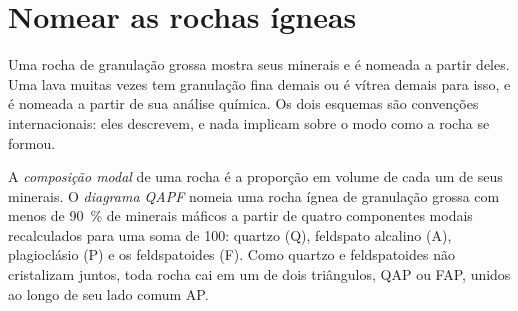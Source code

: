 \section{Nomear as rochas ígneas}\label{sec:b2:magmatic-series:naming}

Uma rocha de granulação grossa mostra seus minerais e é nomeada a partir deles. Uma lava muitas vezes tem granulação
fina demais ou é vítrea demais para isso, e é nomeada a partir de sua análise química. Os dois
esquemas são convenções internacionais: eles descrevem, e nada implicam sobre o modo como
a rocha se formou.

\begin{definition}\label{def:b2:magmatic-series:qapf}
A \emph{composição modal} de uma rocha é a proporção em
volume de cada um de seus minerais. O \emph{diagrama QAPF} nomeia uma
rocha ígnea de granulação grossa com menos de \qty{90}{\percent} de minerais máficos a partir de
quatro componentes modais recalculados para uma soma de 100: quartzo (Q), feldspato alcalino
(A), plagioclásio (P) e os feldspatoides (F). Como quartzo e feldspatoides não
cristalizam juntos, toda rocha cai em um de dois triângulos, QAP ou FAP, unidos
ao longo de seu lado comum AP.
\end{definition}

